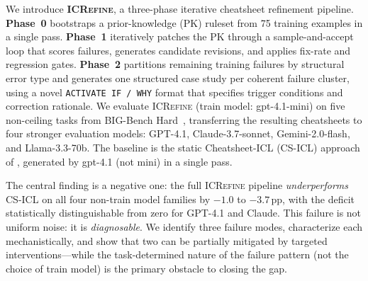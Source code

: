 We introduce \textbf{\textsc{ICRefine}}, a three-phase iterative cheatsheet refinement
pipeline.
\textbf{Phase~0} bootstraps a prior-knowledge (PK) ruleset from 75 training examples in a
single pass.
\textbf{Phase~1} iteratively patches the PK through a sample-and-accept loop that scores
failures, generates candidate revisions, and applies fix-rate and regression gates.
\textbf{Phase~2} partitions remaining training failures by structural error type and
generates one structured case study per coherent failure cluster, using a novel
\texttt{ACTIVATE~IF\,/\,WHY} format that specifies trigger conditions and correction
rationale.
We evaluate \textsc{ICRefine} (train model: gpt-4.1-mini) on five non-ceiling tasks from
BIG-Bench Hard~\citep{bbh}, transferring the resulting cheatsheets to four stronger
evaluation models: GPT-4.1, Claude-3.7-sonnet, Gemini-2.0-flash, and Llama-3.3-70b.
The baseline is the static Cheatsheet-ICL (CS-ICL) approach of \citet{csicl2024},
generated by gpt-4.1 (not mini) in a single pass.

The central finding is a negative one: the full \textsc{ICRefine} pipeline
\emph{underperforms} CS-ICL on all four non-train model families by $-1.0$ to $-3.7$\,pp,
with the deficit statistically distinguishable from zero for GPT-4.1 and Claude.
This failure is not uniform noise: it is \emph{diagnosable}.
We identify three failure modes, characterize each mechanistically, and show that two can
be partially mitigated by targeted interventions---while the task-determined nature of the
failure pattern (not the choice of train model) is the primary obstacle to closing the gap.

